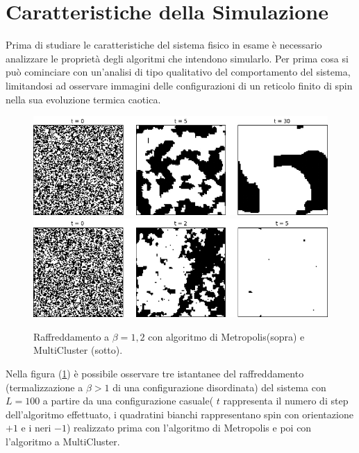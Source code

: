 

\section{Caratteristiche della Simulazione}\label{Parte B}
Prima di studiare le caratteristiche del sistema fisico in esame è necessario analizzare le proprietà degli algoritmi che intendono simularlo.
Per prima cosa si può cominciare con un'analisi di tipo qualitativo del comportamento del sistema, limitandosi ad osservare immagini delle configurazioni di un reticolo finito di spin nella sua evoluzione termica caotica.
   \begin {figure}[h!]
      \begin{center}
      	\caption[1) Preliminari\_Snap\_Metro.cpp $\quad / \quad$2) Preliminari\_Snap\_Cluster.cpp ]{Raffreddamento a $\beta = 1,2 $ con algoritmo di Metropolis(sopra) e MultiCluster (sotto).}\label{fig:3}
        \includegraphics[scale=0.5]{Immagini/Metro_raffreddamento.jpg}
        \includegraphics[scale=0.5]{Immagini/Cluster_raffreddamento.jpg}
      \end{center}
    \end {figure}     
\bigskip \newline   
Nella figura (\ref{fig:3}) è possibile osservare tre istantanee del raffreddamento (termalizzazione a $\beta>1$ di una configurazione disordinata) del sistema con $L=100$ a partire da una configurazione casuale( $t$ rappresenta il numero di step dell'algoritmo effettuato, i quadratini bianchi rappresentano spin con orientazione $+1$ e i neri $-1$) realizzato prima con l'algoritmo di Metropolis e poi con l'algoritmo a MultiCluster. \newline

